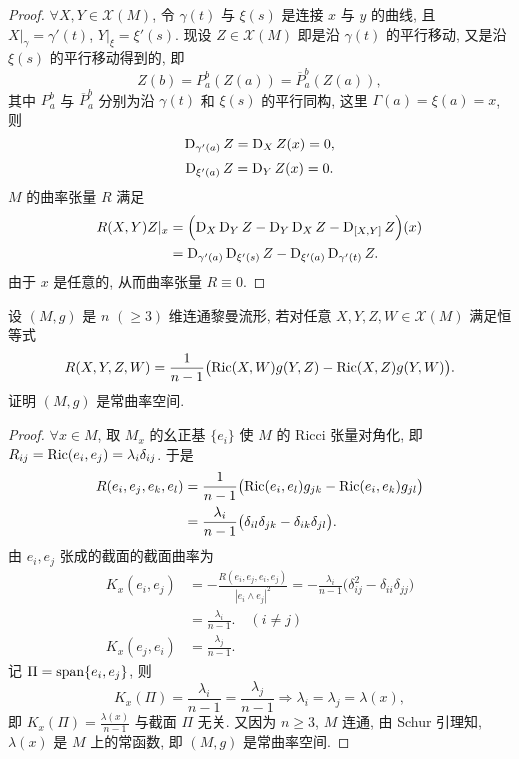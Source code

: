 \begin{proof}
  $\forall X,Y\in\mathscr{X}(M)$, 令 $\gamma(t)$ 与 $\xi(s)$ 是连接 $x$ 与 $y$ 的曲线,
  且 $X|_{\gamma}=\gamma'(t)$, $Y|_{\xi}=\xi'(s)$. 现设 $Z\in\mathscr{X}(M)$
  即是沿 $\gamma(t)$ 的平行移动, 又是沿 $\xi(s)$ 的平行移动得到的, 即
  \[Z(b) = P_a^b(Z(a)) = \overline{P}_a^b(Z(a)),\]
  其中 $P_a^b$ 与 $\overline{P}_a^b$ 分别为沿 $\gamma(t)$ 和 $\xi(s)$
  的平行同构, 这里 $\Gamma(a)=\xi(a)=x$, 则
  \[\operatorname{D}_{\gamma'(a)}Z = \operatorname{D}_X Z(x)=0,\]
  \[\operatorname{D}_{\xi'(a)}Z = \operatorname{D}_Y Z(x)=0.\]
  $M$ 的曲率张量 $R$ 满足
  \begin{align*}
    R(X,Y)Z|_x
    & = \Bigl(\operatorname{D}_X\operatorname{D}_Y Z
      -\operatorname{D}_Y\operatorname{D}_X Z-\operatorname{D}_{[X,Y]}Z\Bigr)(x) \\
    & = \operatorname{D}_{\gamma'(a)}\operatorname{D}_{\xi'(s)}Z
      - \operatorname{D}_{\xi'(a)}\operatorname{D}_{\gamma'(t)}Z.
  \end{align*}
  由于 $x$ 是任意的, 从而曲率张量 $R\equiv 0$.
\end{proof}



\begin{exercise}
  设 $(M,g)$ 是 $n$ $(\geq 3)$ 维连通黎曼流形, 若对任意 $X,Y,Z,W\in\mathscr{X}(M)$ 满足恒等式
  \[R(X,Y,Z,W) = \frac{1}{n-1}\bigl(\operatorname{Ric}(X,W) g(Y,Z) - \operatorname{Ric}(X,Z) g(Y,W)\bigr).\]
  证明 $(M,g)$ 是常曲率空间.
\end{exercise}

\begin{proof}
  $\forall x\in M$, 取 $M_x$ 的幺正基 $\{e_i\}$ 使 $M$ 的 Ricci 张量对角化,
  即 $R_{ij} = \operatorname{Ric}(e_i,e_j) = \lambda_i\delta_{ij}$. 于是
  \begin{align*}
    R(e_i,e_j,e_k,e_l)
    & = \frac{1}{n-1}\bigl(\operatorname{Ric}(e_i,e_l)g_{jk} - \operatorname{Ric}(e_i,e_k)g_{jl}\bigr) \\
    & = \frac{\lambda_i}{n-1}\bigl(\delta_{il}\delta_{jk} - \delta_{ik}\delta_{jl}\bigr).
  \end{align*}
  由 $e_i,e_j$ 张成的截面的截面曲率为
  \begin{align*}
    K_x(e_i,e_j)
    & = -\frac{R(e_i,e_j,e_i,e_j)}{|e_i\wedge e_j|^2}
      = -\frac{\lambda_i}{n-1}\bigl(\delta_{ij}^2 - \delta_{ii}\delta_{jj}\bigr) \\
    & = \frac{\lambda_i}{n-1}.\quad(i\neq j) \\
    K_x(e_j,e_i)
    & = \frac{\lambda_j}{n-1}.
  \end{align*}
  记 $\Pi = \operatorname{span}\{e_i,e_j\}$, 则
  \[K_x(\Pi) = \frac{\lambda_i}{n-1}=\frac{\lambda_j}{n-1}\Rightarrow \lambda_i=\lambda_j=\lambda(x),\]
  即 $K_x(\Pi) = \frac{\lambda(x)}{n-1}$ 与截面 $\Pi$ 无关.
  又因为 $n\geq 3$, $M$ 连通, 由 Schur 引理知, $\lambda(x)$ 是 $M$ 上的常函数,
  即 $(M,g)$ 是常曲率空间.
\end{proof}


